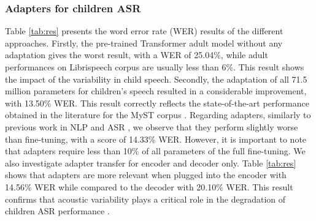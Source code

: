 \subsubsection{Adapters for children ASR}
Table \ref{tab:res} presents the word error rate (WER) results of the different approaches.
Firstly, the pre-trained Transformer adult model without any adaptation gives the worst result, with a WER of 25.04\%, while adult performances on Librispeech corpus are usually less than 6\%. 
This result shows the impact of the variability in child speech.
Secondly, the adaptation of all 71.5 million parameters for children's speech resulted in a considerable improvement, with 13.50\% WER. This result correctly reflects the state-of-the-art performance obtained in the literature for the MyST corpus \cite{sri_end2end}. 
Regarding adapters, similarly to previous work in NLP \cite{houlsby} and ASR \cite{tomanek2021residual}, we observe that they perform slightly worse than fine-tuning, with a score of 14.33\% WER. However, it is important to note that adapters require less than 10\% of all parameters of the full fine-tuning. We also investigate adapter transfer for encoder and decoder only. Table \ref{tab:res} shows that adapters are more relevant when plugged into the encoder with 14.56\% WER while compared to the decoder with 20.10\% WER. This result confirms that acoustic variability plays a critical role in the degradation of children ASR performance \cite{shivakumar2020transfer}. 

